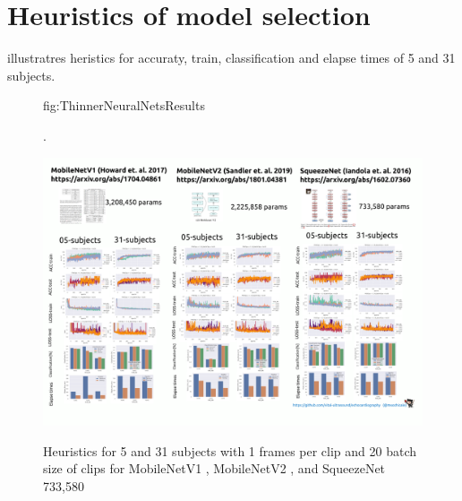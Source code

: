 \documentclass[mlabstract,twocolumn]{jmlr}
\begin{document}
\section{Heuristics of model selection} \label{apd:heuristics}
 illustratres heristics for accuraty, train, classification and elapse times of 5 and 31 subjects.
\begin{figure}[ht]
\floatconts
  {fig:ThinnerNeuralNetsResults}
  {\caption{
    Heuristics for 5 and 31 subjects with 1 frames per clip and 20 batch size of clips for
    MobileNetV1 \citep{2017-howared_CoRR_MobileNetV1}, MobileNetV2 \citep{Sandler_2018_CVPR_MobileNetV2}, and SqueezeNet \citep{iandola2017squeezenet} 733,580
          }.
  }
  {\includegraphics[width=\textwidth]{../figures/comparing-NETS-for-USviewclassification/versions/drawing-v00}}%
\end{figure}
\end{document}
